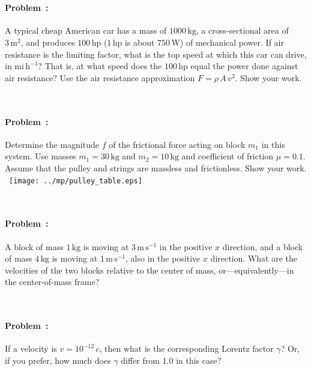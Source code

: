 \documentclass[12pt]{article}
\newcommand{\kg}{\mathrm{kg}}
\newcommand{\m}{\mathrm{m}}
\newcommand{\s}{\mathrm{s}}
\newcommand{\h}{\mathrm{h}}
\newcommand{\mi}{\mathrm{mi}}
\newcommand{\mps}{\m\,\s^{-1}}
\newcommand{\miph}{\mi\,\h^{-1}}
\newcommand{\W}{\mathrm{W}}
\newcommand{\hp}{\mathrm{hp}}
\newcounter{problem}
\begin{document}
~ \vfill ~

\paragraph{Problem~\theproblem:}%
A typical cheap American car has a mass of $1000\,\kg$, a
cross-sectional area of $3\,\m^2$, and produces $100\,\hp$ ($1\,\hp$
is about $750\,\W$) of mechanical power.  If air resistance is the
limiting factor, what is the top speed at which this car can drive, in
$\miph$?  That is, at what speed does the $100\,\hp$ equal the power
done against air resistance?  Use the air resistance approximation
$F=\rho\,A\,v^2$.  Show your work.

~ \vfill ~

\clearpage

\paragraph{Problem~\theproblem:}%
Determine the magnitude $f$ of the frictional force acting on block
$m_1$ in this system.  Use masses $m_1= 30\,\kg$ and $m_2=10\,\kg$ and
coefficient of friction $\mu=0.1$.  Assume that the pulley and strings
are massless and frictionless.  Show your
work.\\ ~\hfill\texttt{[image: ../mp/pulley\_table.eps]}\hfill~

~ \vfill ~

\paragraph{Problem~\theproblem:}%
A block of mass $1\,\kg$ is moving at $3\,\mps$ in the positive $x$
direction, and a block of mass $4\,\kg$ is moving at $1\,\mps$, also
in the positive $x$ direction.  What are the velocities of the two
blocks relative to the center of mass, or---equivalently---in the
center-of-mass frame?

~ \vfill ~

\clearpage

\paragraph{Problem~\theproblem:}%
If a velocity is $v = 10^{-12}\,c$, then what is the corresponding
Lorentz factor $\gamma$?  Or, if you prefer, how much does $\gamma$
differ from 1.0 in this case?

~ \vfill ~
\end{document}
